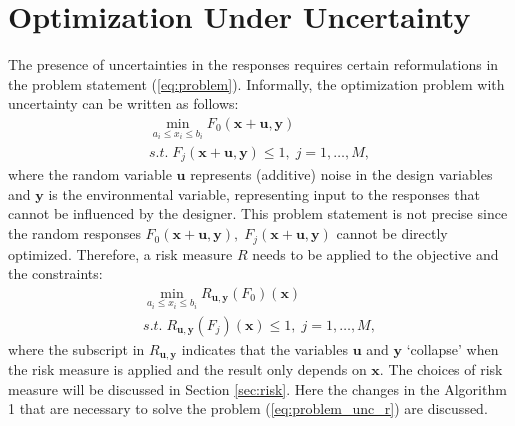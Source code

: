 \documentclass[10pt,twocolumn,a4paper]{article}
\begin{document}
\section{Optimization Under Uncertainty}

The presence of uncertainties in the responses requires certain reformulations in the problem statement (\ref{eq:problem}). Informally, the optimization problem with uncertainty can be written as follows:
\begin{equation}
  \label{eq:problem_unc}
  \begin{array}{c}
  \min\limits_{a_i \le x_i \le b_i}F_0(\pmb x + \pmb u, \pmb y) \\
  s.t.\; F_j(\pmb x + \pmb u, \pmb y) \le 1,\; j=1,\dots ,M,
  \end{array}
\end{equation}
where the random variable $\pmb u$ represents (additive) noise in the design variables and $\pmb y$ is the environmental variable, representing input to the responses that cannot be influenced by the designer. This problem statement is not precise since the random responses $F_0 (\pmb x+\pmb u,\pmb y),\; F_j (\pmb x+\pmb u,\pmb y)$ cannot be directly optimized. Therefore, a risk measure $R$ needs to be applied to the objective and the constraints:
\begin{equation}
  \label{eq:problem_unc_r}
  \begin{array}{c}
  \min\limits_{a_i \le x_i \le b_i}R_{\pmb u,\pmb y}(F_0)(\pmb x) \\
  s.t.\; R_{\pmb u,\pmb y}(F_j)(\pmb x) \le 1,\; j=1,\dots ,M,
  \end{array}
\end{equation}
where the subscript in $R_{\pmb u,\pmb y}$ indicates that the variables $\pmb u$ and $\pmb y$ ‘collapse’ when the risk measure is applied and the result only depends on $\pmb x$. The choices of risk measure will be discussed in Section \ref{sec:risk}. Here the changes in the Algorithm 1 that are necessary to solve the problem (\ref{eq:problem_unc_r}) are discussed.
\end{document}
